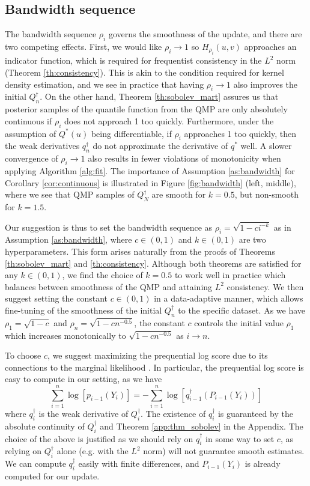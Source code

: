 \documentclass[11pt,a4paper]{article}
\begin{document}
\subsection{Bandwidth sequence }\label{sec:bandwidth}
The bandwidth sequence $\rho_i$ governs the smoothness of the update, and there are two competing effects. First, we would like $\rho_i \to 1$ so $H_{\rho_i}(u,v)$ approaches an indicator function, which is required for frequentist consistency in the $L^2$ norm ({Theorem \ref{th:consistency}}). This is akin to the condition required for kernel density estimation, and we see in practice that having $\rho_i \to 1$ also improves the initial $Q_n^{\dagger}$. On the other hand, {Theorem \ref{th:sobolev_mart}} assures us that posterior samples of the quantile function from the QMP are only absolutely continuous if $\rho_i$ does not approach 1 too quickly. Furthermore, under the assumption of $Q^*(u)$ being differentiable, if $\rho_i$ approaches 1 too quickly, then the weak derivatives $q_n^{\dagger}$ do not approximate the derivative of $q^*$ well. A slower convergence of $\rho_i \to 1$ also results in fewer violations of monotonicity when applying {Algorithm \ref{alg:fit}}. The importance of {Assumption \ref{as:bandwidth}} for {Corollary \ref{cor:continuous}} is illustrated in {Figure \ref{fig:bandwidth} (left, middle)}, where we see that QMP samples of $Q_N^{\dagger}$ are smooth for $k = 0.5$, but non-smooth for $k = 1.5$.

Our suggestion is thus to set the bandwidth sequence as
$\rho_i = \sqrt{1 - ci^{-k}}$ as in {Assumption \ref{as:bandwidth}},
  where $c \in (0,1)$ and $k \in (0,1)$ are two hyperparameters. 
This form arises naturally from the proofs of {Theorems \ref{th:sobolev_mart}} and {\ref{th:consistency}}.
Although both theorems are satisfied for any $k \in (0,1)$,  we find the choice of $k = 0.5$ to work well in practice which balances between smoothness of the QMP and attaining $L^2$ consistency. We then suggest setting the constant $c \in (0,1)$ in a data-adaptive manner, which allows fine-tuning of the smoothness of the 
initial $Q_n^{\dagger}$ to the specific dataset. As we have $\rho_1 = \sqrt{1-c}$ and $\rho_n = \sqrt{1-cn^{-0.5}}$,  the constant $c$ controls the initial value  $\rho_1$ which increases monotonically to $\sqrt{1-cn^{-0.5}}$ as $i \to n$. 

To choose $c$, we suggest maximizing the prequential log  score due to its connections to the marginal likelihood \citep{Dawid1984,Gneiting2007,Fong2020}. In particular, the prequential log score is easy to compute in our setting, as we have
$$\sum_{i = 1}^n \log \left[p_{i-1}(Y_i)\right] = - \sum_{i = 1}^n \log \left[{q_{i-1}^{\dagger}\left(P_{i-1}\left(Y_i\right)\right)}\right]$$
where $q_{i}^{\dagger}$ is the weak derivative of $Q_i^{\dagger}$. The existence of $q_{i}^{\dagger}$ is guaranteed by the absolute continuity of $Q_i^{\dagger}$ and {Theorem \ref{app:thm_sobolev}}
in the Appendix. The choice of the above is justified as we should rely on $q_i^{\dagger}$ in some way to set $c$, as relying on $Q_i^{\dagger}$ alone (e.g. with the $L^2$ norm) will not guarantee smooth estimates. We can compute $q_i^{\dagger}$ easily with finite differences, and $P_{i-1}(Y_i)$ is already computed for our update.
\end{document}
